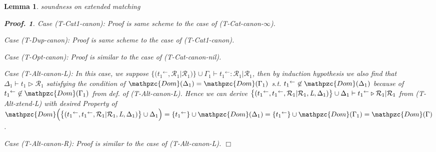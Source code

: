 \documentclass[12pt]{article}
\newtheorem{Lemma}{Lemma}[section]
\newtheorem{Proof}{Proof.}
\begin{document}
\begin{Lemma}{soundness on extended matching}
\begin{Proof}
    Case (T-Cat1-canon): Proof is same scheme to the case of
    (T-Cat-canon-$\infty$).
    
    Case (T-Dup-canon): Proof is same scheme to the case of (T-Cat1-canon).

    Case (T-Opt-canon): Proof is similar to the case of (T-Cat-canon-nil).

    Case (T-Alt-canon-L): In this case, we suppose
    $\bigl\{({t_1}^\leftarrow, \mathcal{R}_1 | \mathcal{R}_1) \bigr\} \cup
    \Gamma_1 \vdash {t_1}^\leftarrow: \mathcal{R}_1 | \mathcal{R}_1$, then
    by induction hypothesis we also find that
    $\Delta_1 \vdash t_1 \triangleright \mathcal{R}_1$ satisfying the
    condition of $\mathpzc{Dom}(\Delta_1) = \mathpzc{Dom}(\Gamma_1)$ s.t.
    ${t_1}^\leftarrow \not\in \mathpzc{Dom}(\Delta_1)$ because of
    ${t_1}^\leftarrow \not\in \mathpzc{Dom}(\Gamma_1)$ from
    def. of (T-Alt-canon-L). Hence we can derive
    $\bigl\{({t_1}^\leftarrow, {t_1}^\leftarrow,
    \mathcal{R}_1 | \mathcal{R}_1, \text{\it L}, \Delta_1) \bigr\} \cup
    \Delta_1 \vdash {t_1}^\leftarrow \triangleright
    \mathcal{R}_1 | \mathcal{R}_1$ from (T-Alt-xtend-L) with desired
    Property of
    $\mathpzc{Dom}\Bigl(\bigl\{({t_1}^\leftarrow, {t_1}^\leftarrow,
    \mathcal{R}_1 | \mathcal{R}_1, \text{\it L}, \Delta_1) \bigr\} \cup
    \Delta_1 \Bigr) =
    \{{t_1}^\leftarrow\} \cup \mathpzc{Dom}(\Delta_1) =
    \{{t_1}^\leftarrow\} \cup \mathpzc{Dom}(\Gamma_1) =
    \mathpzc{Dom}(\Gamma)$.

    Case (T-Alt-canon-R): Proof is similar to the case of (T-Alt-canon-L).
    $\Box$
  \end{Proof}      
\end{Lemma}
\end{document}
